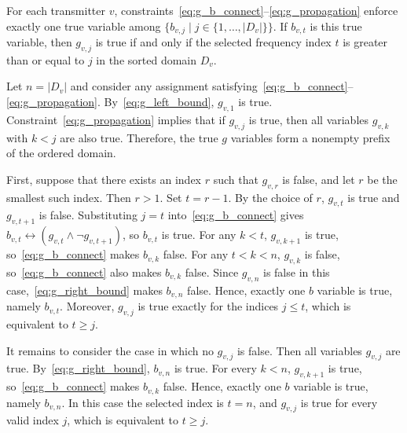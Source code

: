\begin{lemma}
\label{lem:order_variable_semantics}
For each transmitter $v$, constraints~\eqref{eq:g_b_connect}--\eqref{eq:g_propagation} enforce exactly one true variable among $\{b_{v,j}\mid j\in\{1,\ldots,|D_v|\}\}$. If $b_{v,t}$ is this true variable, then $g_{v,j}$ is true if and only if the selected frequency index $t$ is greater than or equal to $j$ in the sorted domain $D_v$.
\end{lemma}
\begin{IEEEproof}
Let $n=|D_v|$ and consider any assignment satisfying~\eqref{eq:g_b_connect}--\eqref{eq:g_propagation}. By~\eqref{eq:g_left_bound}, $g_{v,1}$ is true. Constraint~\eqref{eq:g_propagation} implies that if $g_{v,j}$ is true, then all variables $g_{v,k}$ with $k<j$ are also true. Therefore, the true $g$ variables form a nonempty prefix of the ordered domain.

First, suppose that there exists an index $r$ such that $g_{v,r}$ is false, and let $r$ be the smallest such index. Then $r>1$. Set $t=r-1$. By the choice of $r$, $g_{v,t}$ is true and $g_{v,t+1}$ is false. Substituting $j=t$ into~\eqref{eq:g_b_connect} gives $b_{v,t}\leftrightarrow(g_{v,t}\wedge\neg g_{v,t+1})$, so $b_{v,t}$ is true.
For any $k<t$, $g_{v,k+1}$ is true, so~\eqref{eq:g_b_connect} makes $b_{v,k}$ false. For any $t<k<n$, $g_{v,k}$ is false, so~\eqref{eq:g_b_connect} also makes $b_{v,k}$ false. Since $g_{v,n}$ is false in this case,~\eqref{eq:g_right_bound} makes $b_{v,n}$ false. Hence, exactly one $b$ variable is true, namely $b_{v,t}$. Moreover, $g_{v,j}$ is true exactly for the indices $j\le t$, which is equivalent to $t\ge j$.

It remains to consider the case in which no $g_{v,j}$ is false. Then all variables $g_{v,j}$ are true. By~\eqref{eq:g_right_bound}, $b_{v,n}$ is true. For every $k<n$, $g_{v,k+1}$ is true, so~\eqref{eq:g_b_connect} makes $b_{v,k}$ false. Hence, exactly one $b$ variable is true, namely $b_{v,n}$. In this case the selected index is $t=n$, and $g_{v,j}$ is true for every valid index $j$, which is equivalent to $t\ge j$.
\end{IEEEproof}

